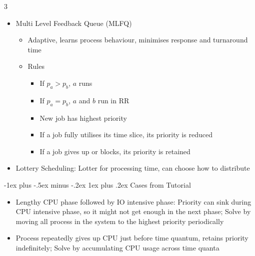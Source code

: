 \documentclass[10pt, landscape]{article}
\makeatletter
\renewcommand{\subsection}{\@startsection{subsection}{3}{0mm}%
                                {-1ex plus -.5ex minus -.2ex}%
                                {1ex plus .2ex}%
                                {\normalfont\small\bfseries}}%
\makeatother
\begin{document}
\begin{multicols*}{3}
\begin{itemize}
    \item Multi Level Feedback Queue (MLFQ)
    \begin{itemize}
        \item Adaptive, learns process behaviour, minimises response and turnaround time
        \item Rules
        \begin{itemize}
            \item If $p_a>p_b$, $a$ runs
            \item If $p_a=p_b$, $a$ and $b$ run in RR
            \item New job has highest priority
            \item If a job fully utilises its time slice, its priority is reduced
            \item If a job gives up or blocks, its priority is retained
        \end{itemize}
    \end{itemize}
    \item Lottery Scheduling: Lotter for processing time, can choose how to distribute
\end{itemize}

\subsection{Cases from Tutorial}
\begin{itemize}
    \item Lengthy CPU phase followed by IO intensive phase: Priority can sink during CPU intensive phase, so it might not get enough in the next phase; Solve by moving all process in the system to the highest priority periodically
    \item Process repeatedly gives up CPU just before time quantum, retains priority indefinitely; Solve by accumulating CPU usage across time quanta
\end{itemize}


\end{multicols*}
\end{document}
